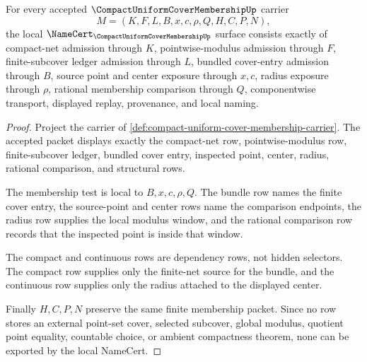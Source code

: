 \begin{theorem}
\label{thm:compact-uniform-cover-membership-obligations}
For every accepted $\CompactUniformCoverMembershipUp$ carrier
$$
M=(K,F,L,B,x,c,\rho,Q,H,C,P,N),
$$
the local $\NameCert_{\CompactUniformCoverMembershipUp}$ surface consists exactly of compact-net admission through $K$, pointwise-modulus admission through $F$, finite-subcover ledger admission through $L$, bundled cover-entry admission through $B$, source point and center exposure through $x,c$, radius exposure through $\rho$, rational membership comparison through $Q$, componentwise transport, displayed replay, provenance, and local naming.
\end{theorem}
\begin{proof}
Project the carrier of \autoref{def:compact-uniform-cover-membership-carrier}. The accepted packet displays exactly the compact-net row, pointwise-modulus row, finite-subcover ledger, bundled cover entry, inspected point, center, radius, rational comparison, and structural rows.

The membership test is local to $B,x,c,\rho,Q$. The bundle row names the finite cover entry, the source-point and center rows name the comparison endpoints, the radius row supplies the local modulus window, and the rational comparison row records that the inspected point is inside that window.

The compact and continuous rows are dependency rows, not hidden selectors. The compact row supplies only the finite-net source for the bundle, and the continuous row supplies only the radius attached to the displayed center.

Finally $H,C,P,N$ preserve the same finite membership packet. Since no row stores an external point-set cover, selected subcover, global modulus, quotient point equality, countable choice, or ambient compactness theorem, none can be exported by the local NameCert.
\end{proof}

